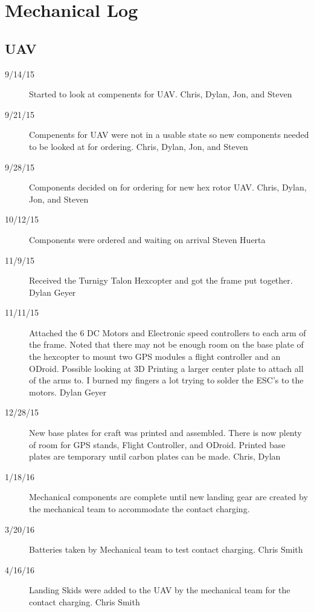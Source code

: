 \section{Mechanical Log}


\subsection{UAV}
\begin{description}

\item [9/14/15]  Started to look at compenents for UAV. \hfill{Chris, Dylan, Jon, and Steven}

\item [9/21/15]  Compenents for UAV were not in a usable state so new components needed to be looked at for ordering. \hfill{Chris, Dylan, Jon, and Steven}

\item [9/28/15]  Components decided on for ordering for new hex rotor UAV. \hfill{Chris, Dylan, Jon, and Steven}

\item [10/12/15]  Components were ordered and waiting on arrival \hfill{Steven Huerta}

\item [11/9/15]  Received the Turnigy Talon Hexcopter and got the frame put together. \hfill{Dylan Geyer}

\item [11/11/15] Attached the 6 DC Motors and Electronic speed controllers to each arm of the frame. Noted that there may not be enough room on the base plate of the hexcopter to mount two GPS modules a flight controller and an ODroid. Possible looking at 3D Printing a larger center plate to attach all of the arms to. I burned my fingers a lot trying to solder the ESC's to the motors. \hfill{Dylan Geyer}

\item [12/28/15]  New base plates for craft was printed and assembled. There is now plenty of room for GPS stands, Flight Controller, and ODroid. Printed base plates are temporary until carbon plates can be made. \hfill{Chris, Dylan}  

\item [1/18/16] Mechanical components are complete until new landing gear are created by the mechanical team to accommodate the contact charging.

\item [3/20/16] Batteries taken by Mechanical team to test contact charging. \hfill{Chris Smith}

\item [4/16/16] Landing Skids were added to the UAV by the mechanical team for the contact charging. \hfill{Chris Smith}

\end{description}